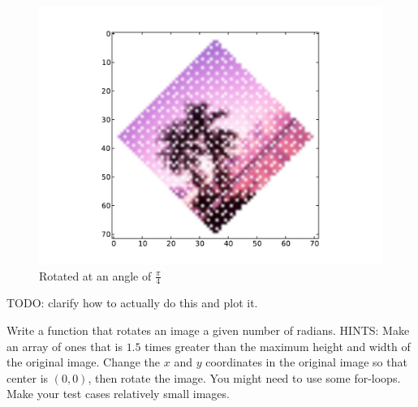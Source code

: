 \begin{figure}
\centering
\includegraphics[width=\textwidth]{rotateimg.pdf}
\caption{Rotated at an angle of $\frac{\pi}{4}$}
\end{figure}

TODO: clarify how to actually do this and plot it.

\begin{problem}
Write a function that rotates an image a given number of radians.
HINTS: Make an array of ones that is $1.5$ times greater than the maximum height and width of the original image.
Change the $x$ and $y$ coordinates in the original image so that center is $(0,0)$, then rotate the image.
You might need to use some for-loops.
Make your test cases relatively small images.
\end{problem}


